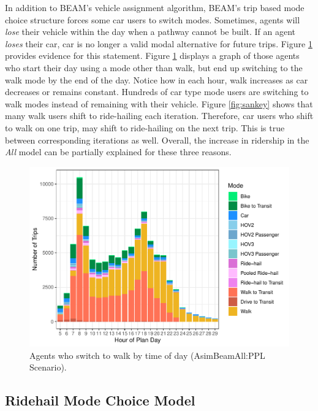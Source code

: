 \documentclass[fancy, masters]{byuthesis}
\begin{document}
In addition to BEAM's vehicle assignment algorithm, BEAM's trip based mode choice structure forces some car users to switch modes. Sometimes, agents will \emph{lose} their vehicle within the day when a pathway cannot be built. If an agent \emph{loses} their car, car is no longer a valid modal alternative for future trips. Figure \ref{fig:walkers} provides evidence for this statement. Figure \ref{fig:walkers} displays a graph of those agents who start their day using a mode other than walk, but end up switching to the walk mode by the end of the day. Notice how in each hour, walk increases as car decreases or remains constant. Hundreds of car type mode users are switching to walk modes instead of remaining with their vehicle. Figure \ref{fig:sankey} shows that many walk users shift to ride-hailing each iteration. Therefore, car users who shift to walk on one trip, may shift to ride-hailing on the next trip. This is true between corresponding iterations as well. Overall, the increase in ridership in the \emph{All} model can be partially explained for these three reasons.

\begin{figure}

{\centering \includegraphics{thesis_files/figure-latex/walkers-1} 

}

\caption{Agents who switch to walk by time of day (AsimBeamAll:PPL Scenario).}\label{fig:walkers}
\end{figure}

\hypertarget{type2}{%
\subsection{Ridehail Mode Choice Model}\label{type2}}
\end{document}
